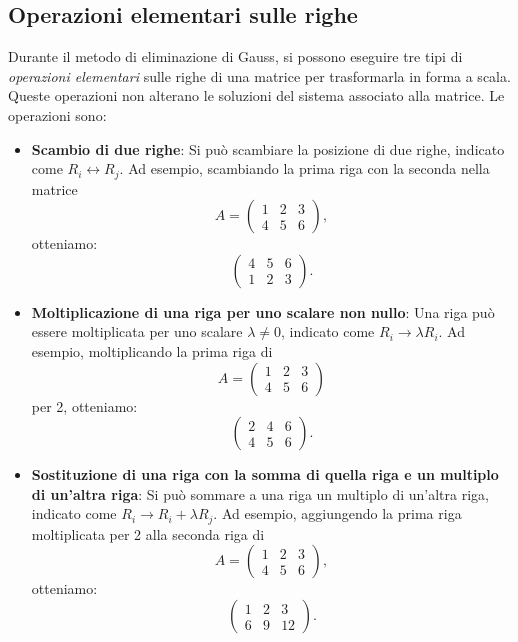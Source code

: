 \documentclass{article}
\begin{document}
\subsection{Operazioni elementari sulle righe}

Durante il metodo di eliminazione di Gauss, si possono eseguire tre tipi di
\emph{operazioni elementari} sulle righe di una matrice per trasformarla in
forma a scala. Queste operazioni non alterano le soluzioni del sistema
associato alla matrice. Le operazioni sono:

\begin{itemize}
	\item \textbf{Scambio di due righe}: Si può scambiare la posizione di due righe, indicato come
	      \( R_i \leftrightarrow R_j \). Ad esempio, scambiando la prima riga con la seconda nella matrice
	      \[
		      A = \begin{pmatrix}
			      1 & 2 & 3 \\
			      4 & 5 & 6
		      \end{pmatrix},
	      \]
	      otteniamo:
	      \[
		      \begin{pmatrix}
			      4 & 5 & 6 \\
			      1 & 2 & 3
		      \end{pmatrix}.
	      \]

	\item \textbf{Moltiplicazione di una riga per uno scalare non nullo}: Una riga può essere
	      moltiplicata per uno scalare \( \lambda \neq 0 \), indicato come \( R_i \to \lambda R_i \).
	      Ad esempio, moltiplicando la prima riga di
	      \[
		      A = \begin{pmatrix}
			      1 & 2 & 3 \\
			      4 & 5 & 6
		      \end{pmatrix}
	      \]
	      per 2, otteniamo:
	      \[
		      \begin{pmatrix}
			      2 & 4 & 6 \\
			      4 & 5 & 6
		      \end{pmatrix}.
	      \]

	\item \textbf{Sostituzione di una riga con la somma di quella riga e un multiplo di un'altra riga}:
	      Si può sommare a una riga un multiplo di un'altra riga, indicato come \( R_i \to R_i + \lambda R_j \).
	      Ad esempio, aggiungendo la prima riga moltiplicata per 2 alla seconda riga di
	      \[
		      A = \begin{pmatrix}
			      1 & 2 & 3 \\
			      4 & 5 & 6
		      \end{pmatrix},
	      \]
	      otteniamo:
	      \[
		      \begin{pmatrix}
			      1 & 2 & 3  \\
			      6 & 9 & 12
		      \end{pmatrix}.
	      \]
\end{itemize}
\end{document}
